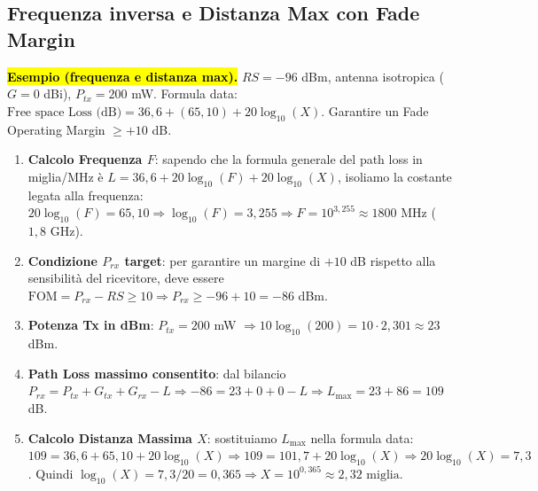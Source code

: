\documentclass[11pt,a4paper]{report}
\begin{document}
\subsection{Frequenza inversa e Distanza Max con Fade Margin}
\hl{\textbf{Esempio (frequenza e distanza max).}} $RS = -96$ dBm, antenna isotropica ($G = 0$ dBi), $P_{tx} = 200$ mW. Formula data: $\text{Free space Loss (dB)} = 36{,}6 + (65{,}10) + 20\log_{10}(X)$. Garantire un Fade Operating Margin $\ge +10$ dB.
\begin{enumerate}[noitemsep]
\item \textbf{Calcolo Frequenza $F$}: sapendo che la formula generale del path loss in miglia/MHz è $L = 36{,}6 + 20\log_{10}(F) + 20\log_{10}(X)$, isoliamo la costante legata alla frequenza:
$20\log_{10}(F) = 65{,}10 \Rightarrow \log_{10}(F) = 3{,}255 \Rightarrow F = 10^{3,255} \approx \boxed{1800 \text{ MHz}}$ ($1{,}8$ GHz).
\item \textbf{Condizione $P_{rx}$ target}: per garantire un margine di $+10$ dB rispetto alla sensibilità del ricevitore, deve essere $\text{FOM} = P_{rx} - RS \ge 10 \Rightarrow P_{rx} \ge -96 + 10 = -86$ dBm.
\item \textbf{Potenza Tx in dBm}: $P_{tx} = 200$ mW $\Rightarrow 10\log_{10}(200) = 10 \cdot 2{,}301 \approx 23$ dBm.
\item \textbf{Path Loss massimo consentito}: dal bilancio $P_{rx} = P_{tx} + G_{tx} + G_{rx} - L \Rightarrow -86 = 23 + 0 + 0 - L \Rightarrow L_{\text{max}} = 23 + 86 = 109$ dB.
\item \textbf{Calcolo Distanza Massima $X$}: sostituiamo $L_{\text{max}}$ nella formula data:
$109 = 36{,}6 + 65{,}10 + 20\log_{10}(X) \Rightarrow 109 = 101{,}7 + 20\log_{10}(X) \Rightarrow 20\log_{10}(X) = 7{,}3$.
Quindi $\log_{10}(X) = 7{,}3 / 20 = 0{,}365 \Rightarrow X = 10^{0,365} \approx \boxed{2{,}32 \text{ miglia}}$.
\end{enumerate}
\end{document}
